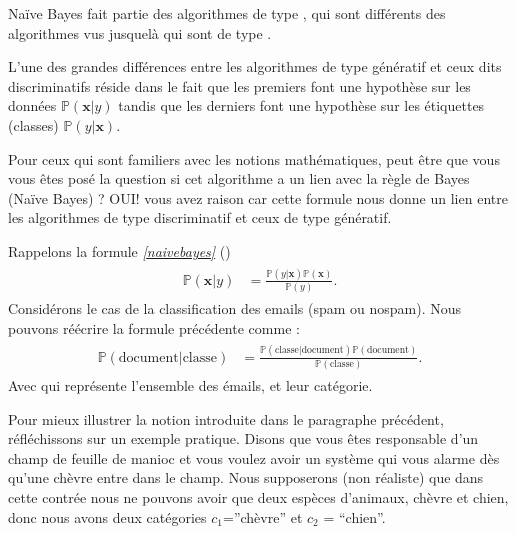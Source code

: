 \documentclass[letterpaper,11pt,english]{sphinxmanual}
\begin{document}
\sphinxAtStartPar
Naïve Bayes fait partie des algorithmes de type , qui sont
différents des algorithmes vus jusque\sphinxhyphen{}là qui sont de type
.

\sphinxAtStartPar
L’une des grandes différences entre les algorithmes de type génératif et
ceux dits discriminatifs réside dans le fait que les premiers font une
hypothèse sur les données \(\mathbb{P}(\mathbf{x}|y)\) tandis que
les derniers font une hypothèse sur les étiquettes (classes)
\(\mathbb{P}(y|\mathbf{x})\).

\sphinxAtStartPar
Pour ceux qui sont familiers avec les notions mathématiques, peut être
que vous vous êtes posé la question si cet algorithme a un lien avec la
règle de Bayes (Naïve Bayes) ? OUI! vous avez raison car cette formule
nous donne un lien entre les algorithmes de type discriminatif et ceux
de type génératif.

\sphinxAtStartPar
Rappelons la formule {\hyperref[\detokenize{chapter3:naivebayes}]{\emph{{[}naivebayes{]}}}} ()
\begin{equation}\label{equation:chapter3:chapter3:49}
\begin{split}\begin{aligned}
    \mathbb{P}(\mathbf{x}|y) &= \frac{\mathbb{P}(y|\mathbf{x}) \mathbb{P}(\mathbf{x})}{\mathbb{P}(y)}.\end{aligned}\end{split}
\end{equation}
\sphinxAtStartPar
Considérons le cas de la classification des emails (spam ou no\sphinxhyphen{}spam).
Nous pouvons ré\sphinxhyphen{}écrire la formule précédente comme :
\begin{equation}\label{equation:chapter3:chapter3:50}
\begin{split}\begin{aligned}
    \mathbb{P}(\mbox{document} |\mbox{classe}) &= \frac{\mathbb{P}(\mbox{classe}|\mbox{document}) \mathbb{P}(\mbox{document})}{\mathbb{P}(\mbox{classe})}. \end{aligned}\end{split}
\end{equation}
\sphinxAtStartPar
Avec  qui représente l’ensemble des émails, et 
leur catégorie.

\sphinxAtStartPar
Pour mieux illustrer la notion introduite dans le paragraphe précédent,
réfléchissons sur un exemple pratique. Disons que vous êtes responsable
d’un champ de feuille de manioc et vous voulez avoir un système qui vous
alarme dès qu’une chèvre entre dans le champ. Nous supposerons (non
réaliste) que dans cette contrée nous ne pouvons avoir que deux espèces
d’animaux, chèvre et chien, donc nous avons deux catégories
\(c_1\)=”chèvre” et \(c_2\) = “chien”.
\end{document}
